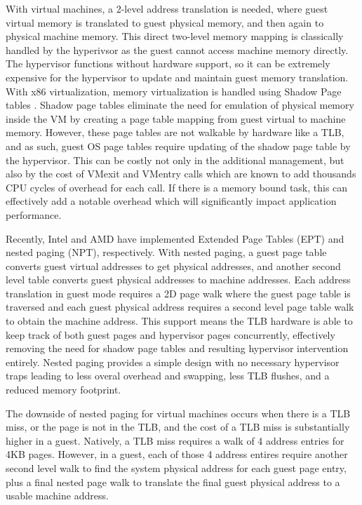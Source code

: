 With virtual machines, a 2-level address translation is needed, where guest virtual memory is translated to guest physical memory, and then again to physical machine memory. This direct two-level memory mapping is classically handled by the hyperivsor as the guest cannot access machine memory directly. The hypervisor functions without hardware support, so it can be extremely expensive for the hypervisor to update and maintain guest memory translation. With x86 virtualization, memory virtualization is handled using Shadow Page tables \cite{rosenblum2005virtual}. Shadow page tables eliminate the need for emulation of physical memory inside the VM by creating a page table mapping from guest virtual to machine memory. However, these page tables are not walkable by hardware like a TLB, and as such, guest OS page tables require updating of the shadow page table by the hypervisor. This can be costly not only in the additional management, but also by the cost of VMexit and VMentry calls which are known to add thousands CPU cycles of overhead for each call.  If there is a memory bound task, this can effectively add a notable overhead which will significantly impact application performance.

Recently, Intel and AMD have implemented Extended Page Tables (EPT) and nested paging (NPT), respectively.  With nested paging, a guest page table converts guest virtual addresses to get physical addresses, and another second level table converts guest physical addresses to machine addresses.  Each address translation in guest mode requires a 2D page walk where the guest page table is traversed and each guest physical address requires a second level page table walk to obtain the machine address. This support means the TLB hardware is able to keep track of both guest pages and hypervisor pages concurrently, effectively removing the need for shadow page tables and resulting hypervisor intervention entirely.  Nested paging provides a simple design with no necessary hypervisor traps leading to less overal overhead and swapping, less TLB flushes, and a reduced memory footprint.

The downside of nested paging for virtual machines occurs when there is a TLB miss, or the page is not in the TLB, and the cost of a TLB miss is substantially higher in a guest. Natively, a TLB miss requires a walk of 4 address entries for 4KB pages. However, in a guest, each of those 4 address entires require another second level walk to find the system physical address for each guest page entry, plus a final nested page walk to translate the final guest physical address to a usable machine address.  

